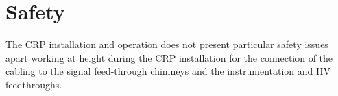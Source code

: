 \section{Safety}
\label{sec:fddp-crp-safety}

The CRP installation and operation does not present particular safety issues apart working at height during the CRP installation for the connection of the cabling to the signal feed-through chimneys and the instrumentation and HV feedthroughs.


























